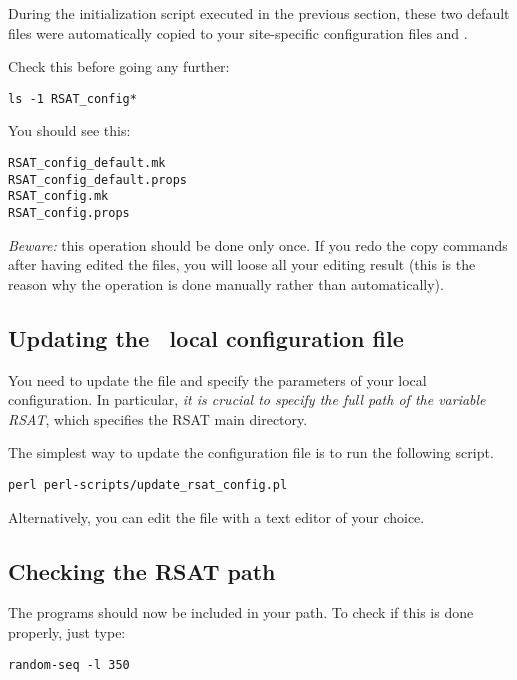 \documentclass[12pt,a4paper, oneside]{scrreprt} %
\begin{document}
During the initialization script executed in the previous section,
these two default files were automatically copied to your
site-specific configuration files  and
.

Check this before going any further: 

\begin{lstlisting}
ls -1 RSAT_config*
\end{lstlisting}

You should see this:
\begin{verbatim}
RSAT_config_default.mk
RSAT_config_default.props
RSAT_config.mk
RSAT_config.props
\end{verbatim}


\emph{Beware:} this operation should be done only once. If you redo
the copy commands after having edited the files, you will loose all
your editing result (this is the reason why the operation is done
manually rather than automatically).

\subsection{Updating the \RSAT\ local configuration file}

You need to update the file  and specify the
parameters of your local configuration. In particular, \emph{it is
  crucial to specify the full path of the variable RSAT}, which
specifies the RSAT main directory.

The simplest way to update the configuration file is to run the following script.

\begin{lstlisting}
perl perl-scripts/update_rsat_config.pl
\end{lstlisting}

Alternatively, you can edit the file  with a
text editor of your choice.

\subsection{Checking the RSAT path}

The \RSAT programs should now be included in your path.  To check if
this is done properly, just type:

\begin{lstlisting}
random-seq -l 350
\end{lstlisting}
\end{document}
